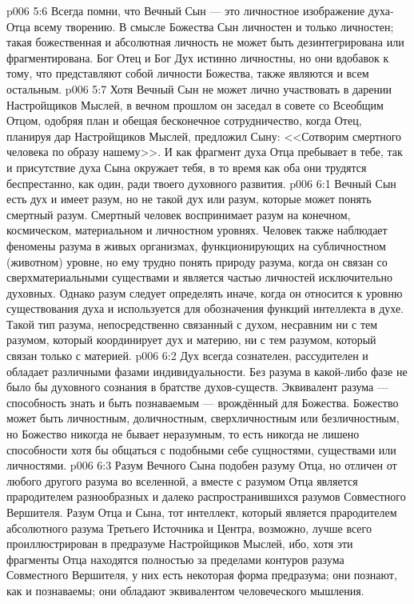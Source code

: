 \vs p006 5:6 Всегда помни, что Вечный Сын --- это личностное изображение духа\hyp{}Отца всему творению. В смысле Божества Сын личностен и только личностен; такая божественная и абсолютная личность не может быть дезинтегрирована или фрагментирована. Бог Отец и Бог Дух истинно личностны, но они вдобавок к тому, что представляют собой личности Божества, также являются и всем остальным.
\vs p006 5:7 Хотя Вечный Сын не может лично участвовать в дарении Настройщиков Мыслей, в вечном прошлом он заседал в совете со Всеобщим Отцом, одобряя план и обещая бесконечное сотрудничество, когда Отец, планируя дар Настройщиков Мыслей, предложил Сыну: <<Сотворим смертного человека по образу нашему>>. И как фрагмент духа Отца пребывает в тебе, так и присутствие духа Сына окружает тебя, в то время как оба они трудятся беспрестанно, как один, ради твоего духовного развития.
\vs p006 6:1 Вечный Сын есть дух и имеет разум, но не такой дух или разум, которые может понять смертный разум. Смертный человек воспринимает разум на конечном, космическом, материальном и личностном уровнях. Человек также наблюдает феномены разума в живых организмах, функционирующих на субличностном (животном) уровне, но ему трудно понять природу разума, когда он связан со сверхматериальными существами и является частью личностей исключительно духовных. Однако разум следует определять иначе, когда он относится к уровню существования духа и используется для обозначения функций интеллекта в духе. Такой тип разума, непосредственно связанный с духом, несравним ни с тем разумом, который координирует дух и материю, ни с тем разумом, который связан только с материей.
\vs p006 6:2 Дух всегда сознателен, рассудителен и обладает различными фазами индивидуальности. Без разума в какой\hyp{}либо фазе не было бы духовного сознания в братстве духов\hyp{}существ. Эквивалент разума --- способность знать и быть познаваемым --- врождённый для Божества. Божество может быть личностным, доличностным, сверхличностным или безличностным, но Божество никогда не бывает неразумным, то есть никогда не лишено способности хотя бы общаться с подобными себе сущностями, существами или личностями.
\vs p006 6:3 Разум Вечного Сына подобен разуму Отца, но отличен от любого другого разума во вселенной, а вместе с разумом Отца является прародителем разнообразных и далеко распространившихся разумов Совместного Вершителя. Разум Отца и Сына, тот интеллект, который является прародителем абсолютного разума Третьего Источника и Центра, возможно, лучше всего проиллюстрирован в предразуме Настройщиков Мыслей, ибо, хотя эти фрагменты Отца находятся полностью за пределами контуров разума Совместного Вершителя, у них есть некоторая форма предразума; они познают, как и познаваемы; они обладают эквивалентом человеческого мышления.
